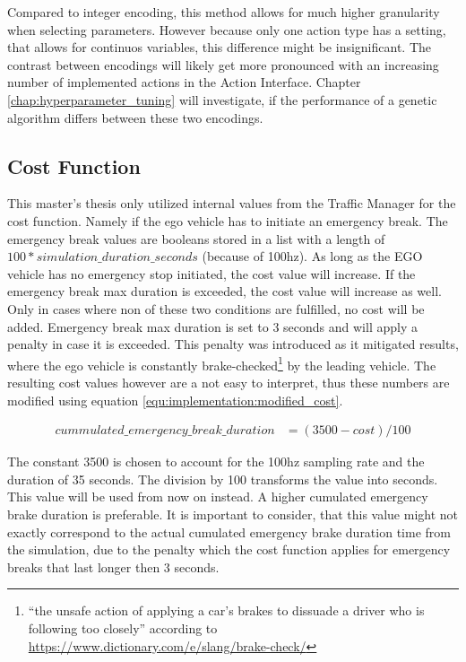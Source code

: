 Compared to integer encoding, this method allows for much higher granularity when selecting parameters. However because only one action type has a setting, that allows for continuos variables, this difference might be insignificant. The contrast between encodings will likely get more pronounced with an increasing number of implemented actions in the Action Interface. Chapter \ref{chap:hyperparameter_tuning} will investigate, if the performance of a genetic algorithm differs between these two encodings.

\subsection{Cost Function}
\label{sect:implementation:cost_function}
This master's thesis only utilized internal values from the Traffic Manager for the cost function. Namely if the ego vehicle has to initiate an emergency break. The emergency break values are booleans stored in a list with a length of $100 * simulation\_duration\_seconds$ (because of 100hz). As long as the EGO vehicle has no emergency stop initiated, the cost value will increase. If the emergency break max duration is exceeded, the cost value will increase as well. Only in cases where non of these two conditions are fulfilled, no cost will be added. Emergency break max duration is set to 3 seconds and will apply a penalty in case it is exceeded. This penalty was introduced as it mitigated results, where the ego vehicle is constantly brake-checked\footnote{\enquote{the unsafe action of applying a car’s brakes to dissuade a driver who is following too closely} according to \href{https://www.dictionary.com/e/slang/brake-check/}{https://www.dictionary.com/e/slang/brake-check/}} by the leading vehicle. The resulting cost values however are a not easy to interpret, thus these numbers are modified using equation \ref{equ:implementation:modified_cost}.

\begin{equation} 
	\label{equ:implementation:modified_cost}
	\begin{split}
		cummulated\_emergency\_break\_duration & = (3500 - cost) / 100
	\end{split}
\end{equation}

The constant 3500 is chosen to account for the 100hz sampling rate and the duration of 35 seconds. The division by 100 transforms the value into seconds. This value will be used from now on instead. A higher cumulated emergency brake duration is preferable. It is important to consider, that this value might not exactly correspond to the actual cumulated emergency brake duration time from the simulation, due to the penalty which the cost function applies for emergency breaks that last longer then 3 seconds.

